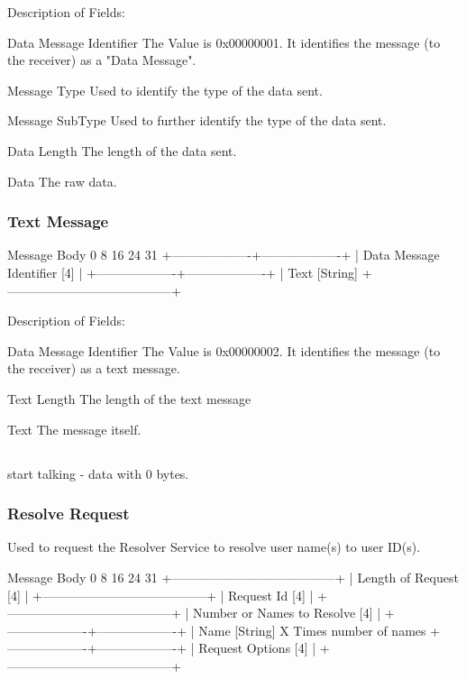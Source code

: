 \documentclass[titlepage,oneside]{book}
\begin{document}
Description of Fields:

Data Message Identifier
  The Value is 0x00000001. It identifies the message (to the
  receiver) as a "Data Message".

Message Type
  Used to identify the type of the data sent.

Message SubType
  Used to further identify the type of the data sent.

Data Length
  The length of the data sent.

Data
  The raw data.

\subsubsection{Text Message}

Message Body
0         8         16        24      31
+-------------------+-------------------+
|     Data Message Identifier [4]       |
+-------------------+-------------------+
|        Text [String]
+---------------------------------------+

Description of Fields:

Data Message Identifier
  The Value is 0x00000002. It identifies the message (to the
  receiver) as a text message.

Text Length
  The length of the text message

Text
  The message itself.

\subsection{}

start talking - data with 0 bytes.

\subsubsection{Resolve Request}

Used to request the Resolver Service to resolve user name(s) to user
ID(s).

Message Body
0         8         16        24      31
+---------------------------------------+
|       Length of Request [4]      |
+---------------------------------------+
|            Request Id [4]             |
+---------------------------------------+
|    Number or Names to Resolve [4]     |
+-------------------+-------------------+
| Name [String]                            X Times number of names
+-------------------+-------------------+
|            Request Options [4]        |
+---------------------------------------+
\end{document}
